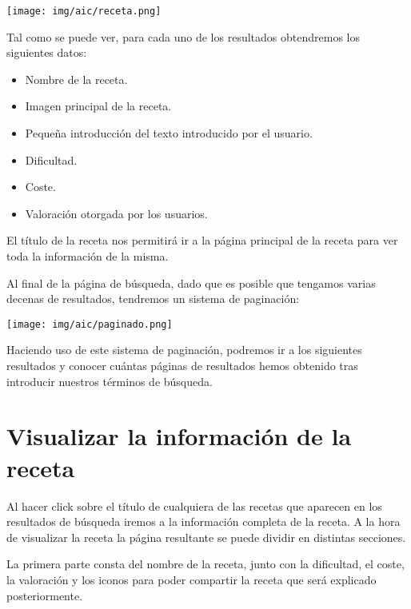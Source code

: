 \documentclass{\ClassPath/viu-tfm-template}
\begin{document}
\begin{center}
    \vspace{-10pt}
    \texttt{[image: img/aic/receta.png]}
    \vspace{-20pt}
\end{center}

Tal como se puede ver, para cada uno de los resultados obtendremos los siguientes datos:

\begin{itemize}
    \item Nombre de la receta.
    \item Imagen principal de la receta.
    \item Pequeña introducción del texto introducido por el usuario.
    \item Dificultad.
    \item Coste.
    \item Valoración otorgada por los usuarios.
\end{itemize}

El título de la receta nos permitirá ir a la página principal de la receta para ver toda la información de la misma.

Al final de la página de búsqueda, dado que es posible que tengamos varias decenas de resultados, tendremos un sistema de paginación:

\begin{center}
    \vspace{-10pt}
    \texttt{[image: img/aic/paginado.png]}
    \vspace{-20pt}
\end{center}

Haciendo uso de este sistema de paginación, podremos ir a los siguientes resultados y conocer cuántas páginas de resultados hemos obtenido tras introducir nuestros términos de búsqueda.

\section{Visualizar la información de la receta}

Al  hacer click sobre el título de cualquiera de las recetas que aparecen en los resultados de búsqueda iremos a la información completa de la receta. A la hora de visualizar la receta la página resultante se puede dividir en distintas secciones.

La primera parte consta del nombre de la receta, junto con la dificultad, el coste, la valoración y los iconos para poder compartir la receta que será explicado posteriormente.
\end{document}

